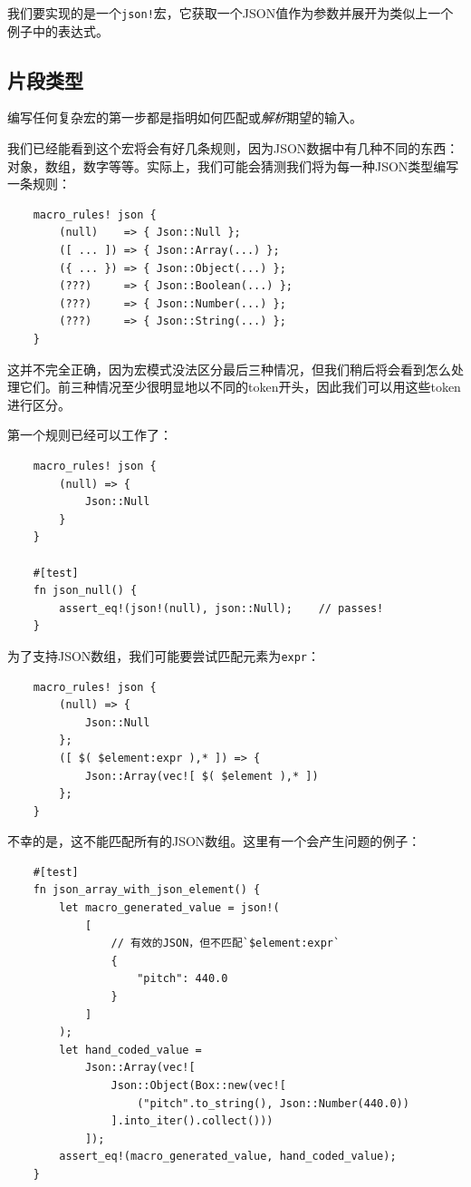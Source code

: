 我们要实现的是一个\texttt{json!}宏，它获取一个JSON值作为参数并展开为类似上一个例子中的表达式。

\subsection{片段类型}\label{FragType}
编写任何复杂宏的第一步都是指明如何匹配或\emph{解析}期望的输入。

我们已经能看到这个宏将会有好几条规则，因为JSON数据中有几种不同的东西：对象，数组，数字等等。实际上，我们可能会猜测我们将为每一种JSON类型编写一条规则：
\begin{verbatim}
    macro_rules! json {
        (null)    => { Json::Null };
        ([ ... ]) => { Json::Array(...) };
        ({ ... }) => { Json::Object(...) };
        (???)     => { Json::Boolean(...) };
        (???)     => { Json::Number(...) };
        (???)     => { Json::String(...) };
    }
\end{verbatim}

这并不完全正确，因为宏模式没法区分最后三种情况，但我们稍后将会看到怎么处理它们。前三种情况至少很明显地以不同的token开头，因此我们可以用这些token进行区分。

第一个规则已经可以工作了：
\begin{verbatim}
    macro_rules! json {
        (null) => {
            Json::Null
        }
    }

    #[test]
    fn json_null() {
        assert_eq!(json!(null), json::Null);    // passes!
    }
\end{verbatim}

为了支持JSON数组，我们可能要尝试匹配元素为\texttt{expr}：
\begin{verbatim}
    macro_rules! json {
        (null) => {
            Json::Null
        };
        ([ $( $element:expr ),* ]) => {
            Json::Array(vec![ $( $element ),* ])
        };
    }
\end{verbatim}

不幸的是，这不能匹配所有的JSON数组。这里有一个会产生问题的例子：
\begin{verbatim}
    #[test]
    fn json_array_with_json_element() {
        let macro_generated_value = json!(
            [
                // 有效的JSON，但不匹配`$element:expr`
                {
                    "pitch": 440.0
                }
            ]
        );
        let hand_coded_value =
            Json::Array(vec![
                Json::Object(Box::new(vec![
                    ("pitch".to_string(), Json::Number(440.0))
                ].into_iter().collect()))
            ]);
        assert_eq!(macro_generated_value, hand_coded_value);
    }
\end{verbatim}

